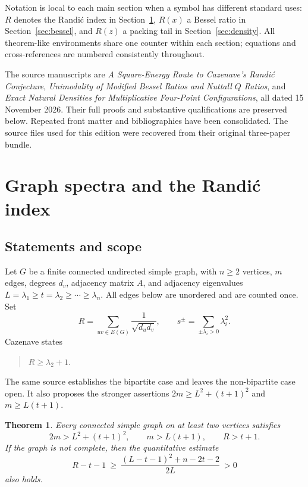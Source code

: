\documentclass[11pt,a4paper]{article}
\newtheorem{theorem}{Theorem}[section]
\theoremstyle{remark}\newtheorem{remark}[theorem]{Remark}
\numberwithin{equation}{section}
\begin{document}
Notation is local to each main section when a symbol has different
standard uses: $R$ denotes the Randi\'c index in Section~\ref{sec:graph},
$R(x)$ a Bessel ratio in Section~\ref{sec:bessel}, and $R(z)$ a packing
tail in Section~\ref{sec:density}. All theorem-like environments share
one counter within each section; equations and cross-references are
numbered consistently throughout.

The source manuscripts are \emph{A Square-Energy Route to Cazenave's
Randi\'c Conjecture}, \emph{Unimodality of Modified Bessel Ratios and
Nuttall $Q$ Ratios}, and \emph{Exact Natural Densities for Multiplicative
Four-Point Configurations}, all dated 15 November 2026. Their full
proofs and substantive qualifications are preserved below. Repeated
front matter and bibliographies have been consolidated. The source
files used for this edition were recovered from their original three-paper bundle.

\section{Graph spectra and the Randi\'c index}
\label{sec:graph}
\subsection{Statements and scope}
Let $G$ be a finite connected undirected simple graph, with $n\ge2$
vertices, $m$ edges, degrees $d_v$, adjacency matrix $A$, and adjacency
eigenvalues $L=\lambda_1\ge t=\lambda_2\ge\cdots\ge\lambda_n$.
All edges below are unordered and are counted once. Set
\[
 R=\sum_{uv\in E(G)}\frac1{\sqrt{d_ud_v}},\qquad
 s^\pm=\sum_{\pm\lambda_i>0}\lambda_i^2.
\]
Cazenave \cite[Section~7, Conjecture~1, \#643]{graph-Caz} states
\begin{quote}$R\ge\lambda_2+1$.\end{quote}
The same source establishes the bipartite case and leaves the
non-bipartite case open. It also proposes the stronger assertions
$2m\ge L^2+(t+1)^2$ and $m\ge L(t+1)$.

\begin{theorem}\label{graph-thm:main}
Every connected simple graph on at least two vertices satisfies
\[
 2m>L^2+(t+1)^2,\qquad m>L(t+1),\qquad R>t+1.
\]
If the graph is not complete, then the quantitative estimate
\begin{equation}\label{graph-eq:gap}
 R-t-1\ \ge\
 \frac{(L-t-1)^2+n-2t-2}{2L}\ >0
\end{equation}
also holds.
\end{theorem}
\end{document}

